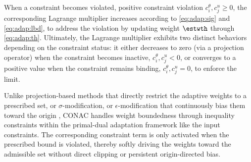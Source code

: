\documentclass[letterpaper, journal, twoside]{IEEEtran}
\begin{document}
When a constraint becomes violated, \ie positive constraint violation $c^{\theta}_{i},c^{u}_{j}\ge0$, the corresponding Lagrange multiplier increases according to \eqref{eq:adap:sig} and \eqref{eq:adap:lbd}, to address the violation by updating weight $\estwth$ through \eqref{eq:adap:th}.
Ultimately, the Lagrange multiplier exhibits two distinct behaviors depending on the constraint status: it either decreases to zero (\eg via a projection operator) when the constraint becomes inactive, $c^{\theta}_i,c^{u}_j < 0$, or converges to a positive value when the constraint remains binding, $c^{\theta}_i,c^{u}_j = 0$, to enforce the limit.

\begin{remark} \label{rem:weight:bound}
  Unlike projection-based methods that directly restrict the adaptive weights to a prescribed set, or $\sigma$-modification, or $\epsilon$-modification that continuously bias them toward the origin \cite{Ryu:2025ab}, CONAC handles weight boundedness through inequality constraints within the primal-dual adaptation framework like the input constraints.
  The corresponding constraint term is only activated when the prescribed bound is violated, thereby softly driving the weights toward the admissible set without direct clipping or persistent origin-directed bias.
\end{remark}
\end{document}
